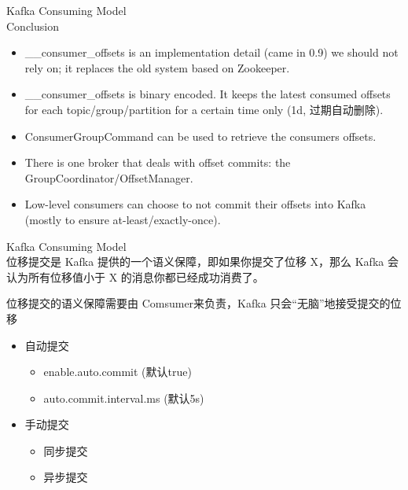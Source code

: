 \begin{frame}[plain,t]{Kafka Consuming Model} %
	 \\  \vspace{2ex}
	Conclusion
	\begin{itemize}
		\item \_\_consumer\_offsets is an implementation detail (came in 0.9) we should not rely on; it replaces the old system based on Zookeeper.
		\item \_\_consumer\_offsets is binary encoded. It keeps the latest consumed offsets for each topic/group/partition for a certain time only (1d, 过期自动删除).
		\item ConsumerGroupCommand can be used to retrieve the consumers offsets.
		\item There is one broker that deals with offset commits: the GroupCoordinator/OffsetManager.
		\item Low-level consumers can choose to not commit their offsets into Kafka (mostly to ensure at-least/exactly-once).
	\end{itemize}
\end{frame}
\begin{frame}[plain,t]{Kafka Consuming Model} %
	 \\  \vspace{2ex}
	位移提交是 Kafka 提供的一个语义保障，即如果你提交了位移 X，那么 Kafka 会认为所有位移值{\color{cyan}小于 X} 的消息你都已经成功消费了。
	
	\vspace{2ex}
	位移提交的语义保障需要由{\color{red} Comsumer}来负责，Kafka 只会“无脑”地接受提交的位移
	
	
	\begin{itemize}
		\item 自动提交
		\begin{itemize}
			\item enable.auto.commit (默认true)
			\item auto.commit.interval.ms (默认5s)
		\end{itemize}
		\item 手动提交
		\begin{itemize}
			\item 同步提交
			\item 异步提交
		\end{itemize}
	\end{itemize}
\end{frame}

